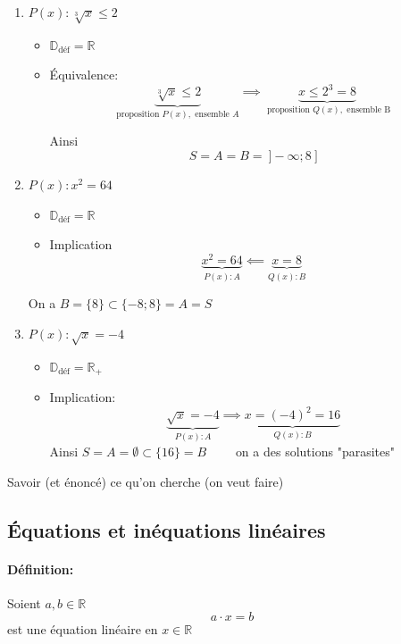 \documentclass[
    11pt,
    a4paper,
    oneside,
    headinlcude, footinclude,
    twoside,
]{report}
\newcommand\Warning{
    \makebox[1.4em][c]{
    \makebox[-5.5pt][c]{\raisebox{.2em}{!}}
    \makebox[0pt][c]{\color{red}\huge$\bigtriangleup$}}
}
\begin{document}
\begin{enumerate}
    \item $P(x): \sqrt[3]{x} \leq 2$ 
        \begin{itemize}
            \item $\mathbb{D}_{\text{déf}} = \mathbb{R}$ 
            \item Équivalence: $$\underbrace{\sqrt[3]{x} \leq 2}_{\text{proposition }
                P(x), \text{ ensemble } A} \implies \underbrace{x \leq 2^{3} =
                8}_{\text{ proposition } Q(x), \text{ ensemble B}}$$ 

                Ainsi
            $$S = A = B =\ ]- \infty; 8\ ]$$
        \end{itemize}
    \item $P(x) : x^{2} = 64$ 
        \begin{itemize}
            \item $\mathbb{D}_{\text{déf}} = \mathbb{R}$ 
            \item Implication $$\underbrace{x^{2} = 64}_{P(x): A} \impliedby
                \underbrace{x = 8}_{Q(x): B}$$
        \end{itemize}
        On a $B = \{8\} \subset \{-8; 8\} = A = S$ 
    \item $P(x): \sqrt{x} = -4$ 
        \begin{itemize}
            \item $\mathbb{D}_{\text{déf}} = \mathbb{R}_{+}$ 
            \item Implication: $$\underbrace{\sqrt{x} = - 4}_{P(x): A}
                \implies \underbrace{x = (-4)^{2} = 16}_{Q(x): B}$$
                Ainsi $S = A = \emptyset \subset \{16\} = B \quad \quad$ 
                {\color{red} on a des solutions "parasites"}
        \end{itemize}
\end{enumerate}

\Warning Savoir (et énoncé) ce qu'on cherche (on veut faire) 

\subsection{Équations et inéquations linéaires}

\paragraph{Définition:}

Soient $a, b \in \mathbb{R}$ 
$$a \cdot x = b$$
est une équation linéaire en $x \in \mathbb{R}$ 
\end{document}
